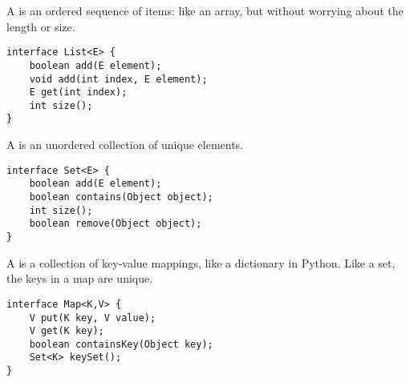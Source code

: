 A  is an ordered sequence of items: like an array, but without worrying about the length or size.

\begin{lstlisting}
interface List<E> {
    boolean add(E element);
    void add(int index, E element);
    E get(int index);
    int size();
}
\end{lstlisting}

A  is an unordered collection of unique elements.

\begin{lstlisting}
interface Set<E> {
    boolean add(E element);
    boolean contains(Object object);
    int size();
    boolean remove(Object object);
}
\end{lstlisting}

A  is a collection of key-value mappings, like a dictionary in Python. Like a set, the keys in a map are unique.

\begin{lstlisting}
interface Map<K,V> {
    V put(K key, V value);
    V get(K key);
    boolean containsKey(Object key);
    Set<K> keySet();
}
\end{lstlisting}